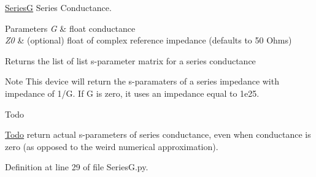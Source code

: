 \hyperlink{namespaceSignalIntegrity_1_1Devices_1_1SeriesG}{SeriesG} Series Conductance. 


\begin{DoxyParams}{Parameters}
{\em G} & float conductance \\
\hline
{\em Z0} & (optional) float of complex reference impedance (defaults to 50 Ohms) \\
\hline
\end{DoxyParams}
\begin{DoxyReturn}{Returns}
the list of list s-\/parameter matrix for a series conductance 
\end{DoxyReturn}
\begin{DoxyNote}{Note}
This device will return the s-\/paramaters of a series impedance with impedance of 1/G. If G is zero, it uses an impedance equal to 1e25. 
\end{DoxyNote}
\begin{DoxyRefDesc}{Todo}
\item[\hyperlink{todo__todo000003}{Todo}]return actual s-\/parameters of series conductance, even when conductance is zero (as opposed to the weird numerical approximation). \end{DoxyRefDesc}


Definition at line 29 of file Series\+G.\+py.


